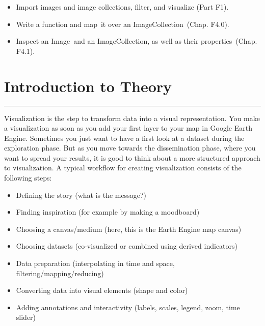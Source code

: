 \documentclass[
  letterpaper,
  DIV=11,
  numbers=noendperiod]{scrreprt}
\providecommand{\tightlist}{%
  \setlength{\itemsep}{0pt}\setlength{\parskip}{0pt}}\usepackage{longtable,booktabs,array}
\begin{document}

\begin{itemize}
\tightlist
\item
  Import images and image collections, filter, and visualize (Part F1).
\item
  Write a function and map~it over an ImageCollection~(Chap. F4.0).
\item
  Inspect an Image~and an ImageCollection, as well as their
  properties~(Chap. F4.1).
\end{itemize}

\hypertarget{introduction-to-theory-14}{%
\section*{Introduction to Theory}\label{introduction-to-theory-14}}


\begin{center}\rule{0.5\linewidth}{0.5pt}\end{center}

Visualization is the step to transform data into a visual
representation. You make a visualization as soon as you add your first
layer to your map in Google Earth Engine. Sometimes you just want to
have a first look at a dataset during the exploration phase. But as you
move towards the dissemination phase, where you want to spread your
results, it is good to think about a more structured approach to
visualization. A typical workflow for creating visualization consists of
the following steps:

\begin{itemize}
\tightlist
\item
  Defining the story (what is the message?)
\item
  Finding inspiration (for example by making a moodboard)
\item
  Choosing a canvas/medium (here, this is the Earth Engine map canvas)
\item
  Choosing datasets (co-visualized or combined using derived indicators)
\item
  Data preparation (interpolating in time and space,
  filtering/mapping/reducing)
\item
  Converting data into visual elements (shape and color)
\item
  Adding annotations and interactivity (labels, scales, legend, zoom,
  time slider)
\end{itemize}
\end{document}
